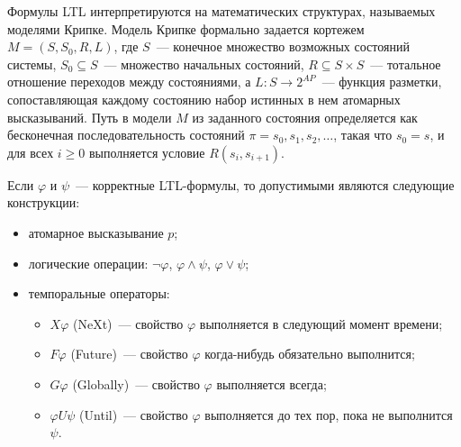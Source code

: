 Формулы LTL интерпретируются на математических структурах, называемых моделями Крипке. Модель Крипке формально задается кортежем $M = (S, S_0, R, L)$, где $S$~--- конечное множество возможных состояний системы, $S_0 \subseteq S$~--- множество начальных состояний, $R \subseteq S \times S$~--- тотальное отношение переходов между состояниями, а $L \colon S \to 2^{AP}$~--- функция разметки, сопоставляющая каждому состоянию набор истинных в нем атомарных высказываний. Путь в модели $M$ из заданного состояния определяется как бесконечная последовательность состояний $\pi = s_0, s_1, s_2, \dots$, такая что $s_0 = s$, и для всех $i \ge 0$ выполняется условие $R(s_i, s_{i+1})$.
\vspace{\baselineskip}
\begin{definition}\label{def:ltl_syntax}
    Если $\varphi$ и $\psi$~--- корректные LTL-формулы, то допустимыми являются следующие конструкции:
    \begin{itemize}
        \item атомарное высказывание $p$;
        \item логические операции: $\neg\varphi$, $\varphi \land \psi$, $\varphi \lor \psi$;
        \item темпоральные операторы:
        \begin{itemize}
            \item $X\varphi$ (NeXt)~--- свойство $\varphi$ выполняется в следующий момент времени;
            \item $F\varphi$ (Future)~--- свойство $\varphi$ когда-нибудь обязательно выполнится;
            \item $G\varphi$ (Globally)~--- свойство $\varphi$ выполняется всегда;
            \item $\varphi U \psi$ (Until)~--- свойство $\varphi$ выполняется до тех пор, пока не выполнится $\psi$.
        \end{itemize}
    \end{itemize}
\end{definition}

